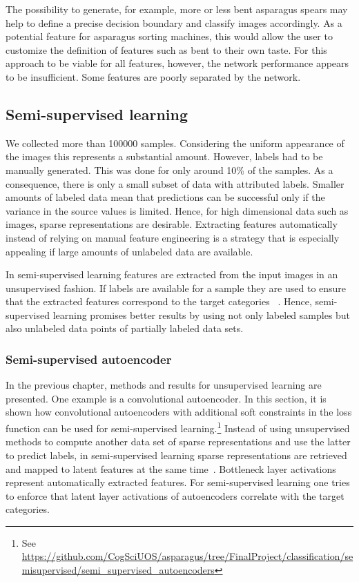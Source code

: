 The possibility to generate, for example, more or less bent asparagus spears may help to define a precise decision boundary and classify images accordingly. As a potential feature for asparagus sorting machines, this would allow the user to customize the definition of features such as bent to their own taste. For this approach to be viable for all features, however, the network performance appears to be insufficient. Some features are poorly separated by the network.


\subsection{Semi-supervised learning}
\label{sec:SemiSupervisedLearning}

We collected more than 100000 samples. Considering the uniform appearance of the images this represents a substantial amount. However, labels had to be manually generated. This was done for only around 10\% of the samples. As a consequence, there is only a small subset of data with attributed labels. Smaller amounts of labeled data mean that predictions can be successful only if the variance in the source values is limited. Hence, for high dimensional data such as images, sparse representations are desirable. Extracting features automatically instead of relying on manual feature engineering is a strategy that is especially 
appealing if large amounts of unlabeled data are available.

In semi-supervised learning features are extracted from the input images in an unsupervised fashion. If labels are available for a sample they are used to ensure that the extracted features correspond to the target categories  ~\citep{keng2017semi}. Hence, semi-supervised learning promises better results by using not only labeled samples but also unlabeled data points of partially labeled data sets.


\subsubsection{Semi-supervised autoencoder}
\label{subsec:VariationalAutoencoder}

In the previous chapter, methods and results for unsupervised learning are presented. One example is a convolutional autoencoder. In this section, it is shown how convolutional autoencoders with additional soft constraints in the loss function can be used for semi-supervised learning.\footnote{See \url{https://github.com/CogSciUOS/asparagus/tree/FinalProject/classification/semisupervised/semi_supervised_autoencoders}} Instead of using unsupervised methods to compute another data set of sparse representations and use the latter to predict labels, in semi-supervised learning sparse representations are retrieved and mapped to latent features at the same time~\citep{keng2017semi}. Bottleneck layer activations represent automatically extracted features. For semi-supervised learning one tries to enforce that latent layer activations of autoencoders correlate with the target categories.

